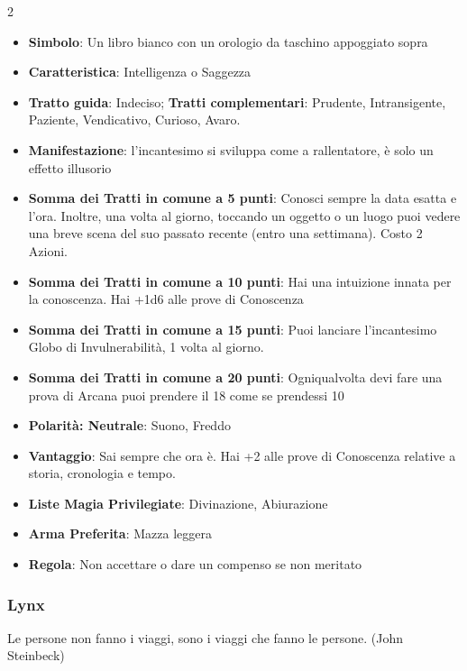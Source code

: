\begin{multicols}{2}
\begin{itemize}[leftmargin=*] \setlength{\itemsep}{0pt}
\item \textbf{Simbolo}: Un libro bianco con un orologio da taschino appoggiato sopra
\item \textbf{Caratteristica}: Intelligenza o Saggezza
\item \textbf{Tratto guida}: Indeciso; \textbf{Tratti complementari}: Prudente, Intransigente, Paziente, Vendicativo, Curioso, Avaro.
\item \textbf{Manifestazione}: l'incantesimo si sviluppa come a rallentatore, è solo un effetto illusorio
\item \textbf{Somma dei Tratti in comune a 5 punti}: Conosci sempre la data esatta e l'ora. Inoltre, una volta al giorno, toccando un oggetto o un luogo puoi vedere una breve scena del suo passato recente (entro una settimana). Costo 2 Azioni.
\item \textbf{Somma dei Tratti in comune a 10 punti}: Hai una intuizione innata per la conoscenza. Hai +1d6 alle prove di Conoscenza
\item \textbf{Somma dei Tratti in comune a 15 punti}: Puoi lanciare l'incantesimo Globo di Invulnerabilità, 1 volta al giorno.
\item \textbf{Somma dei Tratti in comune a 20 punti}: Ogniqualvolta devi fare una prova di Arcana puoi prendere il 18 come se prendessi 10
\item \textbf{Polarità: Neutrale}: Suono, Freddo
\item \textbf{Vantaggio}: Sai sempre che ora è. Hai +2 alle prove di Conoscenza relative a storia, cronologia e tempo.
\item \textbf{Liste Magia Privilegiate}: Divinazione, Abiurazione
\item \textbf{Arma Preferita}: Mazza leggera
\item \textbf{Regola}: Non accettare o dare un compenso se non meritato
\end{itemize}

\subsubsection{Lynx}\label{lynx}\hypertarget{lynx}{}

\begin{enfasi}{
Le persone non fanno i viaggi, sono i viaggi che fanno le persone. (John Steinbeck)}
\end{enfasi}


\end{multicols}
